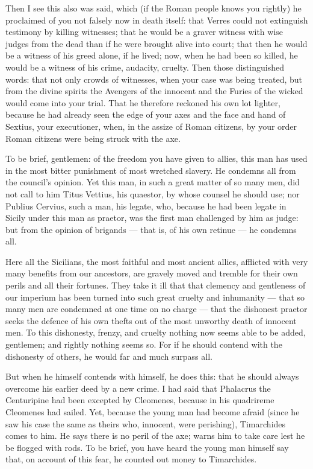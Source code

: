  Then I see this also was said, which (if the Roman people knows you rightly) he proclaimed of you not falsely now in death itself: that Verres could not extinguish testimony by killing witnesses; that he would be a graver witness with wise judges from the dead than if he were brought alive into court; that then he would be a witness of his greed alone, if he lived; now, when he had been so killed, he would be a witness of his crime, audacity, cruelty. Then those distinguished words: that not only crowds of witnesses, when your case was being treated, but from the divine spirits the Avengers of the innocent and the Furies of the wicked would come into your trial. That he therefore reckoned his own lot lighter, because he had already seen the edge of your axes and the face and hand of Sextius, your executioner, when, in the assize of Roman citizens, by your order Roman citizens were being struck with the axe.

 To be brief, gentlemen: of the freedom you have given to allies, this man has used in the most bitter punishment of most wretched slavery. He condemns all from the council's opinion. Yet this man, in such a great matter of so many men, did not call to him Titus Vettius, his quaestor, by whose counsel he should use; nor Publius Cervius, such a man, his legate, who, because he had been legate in Sicily under this man as praetor, was the first man challenged by him as judge: but from the opinion of brigands --- that is, of his own retinue --- he condemns all.

 Here all the Sicilians, the most faithful and most ancient allies, afflicted with very many benefits from our ancestors, are gravely moved and tremble for their own perils and all their fortunes. They take it ill that that clemency and gentleness of our imperium has been turned into such great cruelty and inhumanity --- that so many men are condemned at one time on no charge --- that the dishonest praetor seeks the defence of his own thefts out of the most unworthy death of innocent men. To this dishonesty, frenzy, and cruelty nothing now seems able to be added, gentlemen; and rightly nothing seems so. For if he should contend with the dishonesty of others, he would far and much surpass all.

 But when he himself contends with himself, he does this: that he should always overcome his earlier deed by a new crime. I had said that Phalacrus the Centuripine had been excepted by Cleomenes, because in his quadrireme Cleomenes had sailed. Yet, because the young man had become afraid (since he saw his case the same as theirs who, innocent, were perishing), Timarchides comes to him. He says there is no peril of the axe; warns him to take care lest he be flogged with rods. To be brief, you have heard the young man himself say that, on account of this fear, he counted out money to Timarchides.

